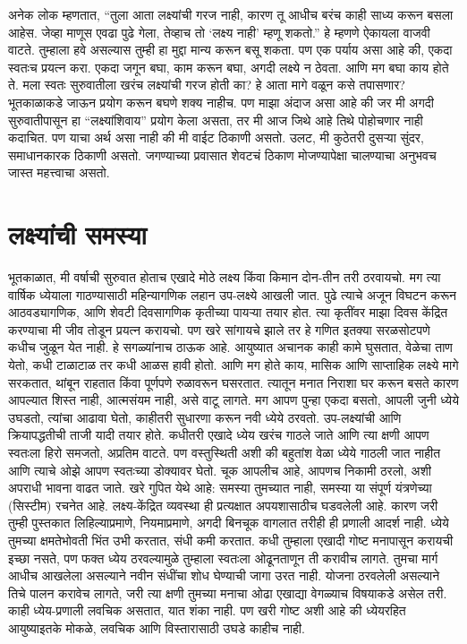 अनेक लोक म्हणतात, “तुला आता लक्ष्यांची गरज नाही, कारण तू आधीच बरंच काही साध्य करून बसला आहेस. जेव्हा माणूस एवढा पुढे गेला, तेव्हाच तो ‘लक्ष्य नाही’ म्हणू शकतो.” हे म्हणणे ऐकायला वाजवी वाटते. तुम्हाला हवे असल्यास तुम्ही हा मुद्दा मान्य करून बसू शकता. पण एक पर्याय असा आहे की,  एकदा स्वतःच प्रयत्न करा. एकदा जगून बघा, काम करून बघा, अगदी लक्ष्ये न ठेवता. आणि मग बघा काय होते ते.
मला स्वतः सुरुवातीला खरंच लक्ष्यांची गरज होती का? हे आता मागे वळून कसे तपासणार? भूतकाळाकडे जाऊन प्रयोग करून बघणे शक्य नाहीच. पण माझा अंदाज असा आहे की जर मी अगदी सुरुवातीपासून हा “लक्ष्यांशिवाय” प्रयोग केला असता, तर मी आज जिथे आहे तिथे पोहोचणार नाही कदाचित. पण याचा अर्थ असा नाही की मी वाईट ठिकाणी असतो. उलट, मी कुठेतरी दुसर्‍या सुंदर, समाधानकारक ठिकाणी असतो. जगण्याच्या प्रवासात शेवटचं ठिकाण मोजण्यापेक्षा चालण्याचा अनुभवच जास्त महत्त्वाचा असतो.


\section*{लक्ष्यांची समस्या}
भूतकाळात, मी वर्षाची सुरुवात होताच एखादे मोठे लक्ष्य किंवा किमान दोन-तीन तरी ठरवायचो. मग त्या वार्षिक ध्येयाला गाठण्यासाठी महिन्यागणिक लहान उप-लक्ष्ये आखली जात. पुढे त्याचे अजून विघटन करून आठवड्यागणिक, आणि शेवटी दिवसागणिक कृतीच्या पायऱ्या तयार होत. त्या कृतींवर माझा दिवस केंद्रित करण्याचा मी जीव तोडून प्रयत्न करायचो.
पण खरे सांगायचे झाले तर हे गणित इतक्या सरळसोटपणे कधीच जुळून येत नाही. हे सगळ्यांनाच ठाऊक आहे. आयुष्यात अचानक काही कामे घुसतात, वेळेचा ताण येतो, कधी टाळाटाळ तर कधी आळस हावी होतो. आणि मग होते काय, मासिक आणि साप्ताहिक लक्ष्ये मागे सरकतात, थांबून राहतात किंवा पूर्णपणे रुळावरून घसरतात. त्यातून मनात निराशा घर करून बसते कारण आपल्यात शिस्त नाही, आत्मसंयम नाही, असे वाटू लागते. मग आपण पुन्हा एकदा बसतो, आपली जुनी ध्येये उघडतो, त्यांचा आढावा घेतो, काहीतरी सुधारणा करून नवी ध्येये ठरवतो. उप-लक्ष्यांची आणि क्रियापद्धतीची ताजी यादी तयार होते.
कधीतरी एखादे ध्येय खरंच गाठले जाते आणि त्या क्षणी आपण स्वतःला हिरो समजतो, अप्रतिम वाटते. पण वस्तुस्थिती अशी की बहुतांश वेळा ध्येये गाठली जात नाहीत आणि त्याचे ओझे आपण स्वतःच्या डोक्यावर घेतो. चूक आपलीच आहे, आपणच निकामी ठरलो, अशी अपराधी भावना वाढत जाते.
खरे गुपित येथे आहे: समस्या तुमच्यात नाही, समस्या या संपूर्ण यंत्रणेच्या (सिस्टीम) रचनेत आहे. लक्ष्य-केंद्रित व्यवस्था ही प्रत्यक्षात अपयशासाठीच घडवलेली आहे.
कारण जरी तुम्ही पुस्तकात लिहिल्याप्रमाणे, नियमाप्रमाणे, अगदी बिनचूक वागलात तरीही ही प्रणाली आदर्श नाही. ध्येये तुमच्या क्षमतेभोवती भिंत उभी करतात, संधी कमी करतात. कधी तुम्हाला एखादी गोष्ट मनापासून करायची इच्छा नसते, पण फक्त ध्येय ठरवल्यामुळे तुम्हाला स्वतःला ओढूनताणून ती करावीच लागते. तुमचा मार्ग आधीच आखलेला असल्याने नवीन संधींचा शोध घेण्याची जागा उरत नाही. योजना ठरवलेली असल्याने तिचे पालन करावेच लागते, जरी त्या क्षणी तुमच्या मनाचा ओढा एखाद्या वेगळ्याच विषयाकडे असेल तरी.
काही ध्येय-प्रणाली लवचिक असतात, यात शंका नाही. पण खरी गोष्ट अशी आहे की ध्येयरहित आयुष्याइतके मोकळे, लवचिक आणि विस्तारासाठी उघडे काहीच नाही.
